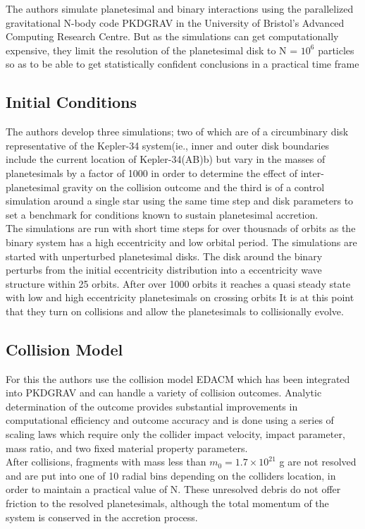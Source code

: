 The authors simulate planetesimal and binary interactions using the parallelized gravitational N-body code PKDGRAV in the University of Bristol’s Advanced Computing Research
Centre. But as the simulations can get computationally expensive, they limit the resolution of the planetesimal disk to N = $10^6$ particles so as to be able to get statistically confident conclusions in a practical time frame

\subsection{Initial Conditions}
 The authors develop three simulations; two of which are of a circumbinary disk representative of the Kepler-34 system(ie., inner and outer disk boundaries include the current location of Kepler-34(AB)b) but vary in the masses of planetesimals by a factor of 1000 in order to determine the effect of inter-planetesimal gravity on the collision outcome and the third is of a control simulation around a single star using the same time step and disk parameters to set a benchmark for conditions known to sustain planetesimal accretion. 
\\
The simulations are run with short time steps for over thousnads of orbits as the binary system has a high eccentricity and low orbital period. The simulations are started with unperturbed planetesimal disks. The disk around the binary perturbs from the initial eccentricity distribution into a eccentricity wave structure within 25 orbits. After over 1000 orbits it reaches a quasi steady state with low and high eccentricity planetesimals on crossing orbits
It is at this point that they turn on collisions and allow the planetesimals to collisionally evolve.


\subsection{Collision Model}
For this the authors use the collision model EDACM which has been integrated into PKDGRAV and can handle a variety of collision outcomes. Analytic determination of the outcome provides substantial improvements in computational efficiency and outcome accuracy and is done using a series of scaling laws which require only the collider impact velocity, impact parameter, mass ratio, and two fixed material property parameters.
\\
After collisions, fragments with mass less than $m_0 = 1.7 \times 10^{21}$ g are not resolved and are put into one of 10 radial bins depending on the colliders location, in order to maintain a practical value of N. These unresolved debris do not offer friction to the resolved planetesimals, although the total momentum of the system is conserved in the accretion process.
